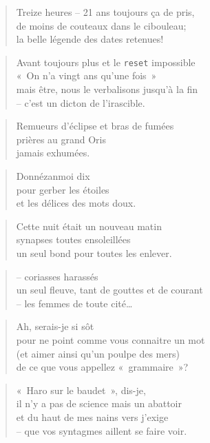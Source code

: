   \begin{verse}
    Treize heures -- 21 ans toujours ça de pris,\\
    de moins de couteaux dans le cibouleau;\\
    la belle légende des dates retenues!
  \end{verse}
  \begin{verse}
    Avant toujours plus et le \texttt{reset} impossible\\
    «~On n’a vingt ans qu’une fois~»\\
    mais être, nous le verbalisons jusqu’à la fin\\
    -- c’est un dicton de l’irascible.
  \end{verse}
  \begin{verse}
    Remueurs d’éclipse et bras de fumées\\
    prières au grand Oris\\
    jamais exhumées.
  \end{verse}
  \begin{verse}
    Donnézanmoi dix\\
    pour gerber les étoiles\\
    et les délices des mots doux.
  \end{verse}
  \begin{verse}
    Cette nuit était un nouveau matin\\
    synapses toutes ensoleillées\\
    un seul bond pour toutes les enlever.
  \end{verse}
  \begin{verse}
    -- coriasses harassés\\
    un seul fleuve, tant de gouttes et de courant\\
    -- les femmes de toute cité…
  \end{verse}
  \begin{verse}
    Ah, serais-je si sôt\\
    pour ne point comme vous connaitre un mot\\
    (et aimer ainsi qu’un poulpe des mers)\\
    de ce que vous appellez «~grammaire~»?
  \end{verse}
  \begin{verse}
    «~Haro sur le baudet~», dis-je,\\
    il n’y a pas de science mais un abattoir\\
    et du haut de mes nains vers j’exige\\
    -- que vos syntagmes aillent se faire voir.
  \end{verse}
